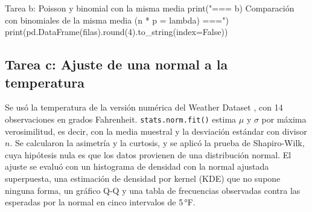 \documentclass[11pt,letterpaper]{article}
\begin{document}
\begin{codigo}[label=cod:b]{Tarea b: Poisson y binomial con la misma media}
print("\n=== b) Comparación con binomiales de la misma media (n * p = lambda) ===")
print(pd.DataFrame(filas).round(4).to_string(index=False))
\end{codigo}

\subsection{Tarea c: Ajuste de una normal a la temperatura}

Se usó la temperatura de la versión numérica del Weather Dataset \parencite{witten2017}, con 14 observaciones en grados Fahrenheit. \texttt{stats.norm.fit()} estima $\mu$ y $\sigma$ por máxima verosimilitud, es decir, con la media muestral y la desviación estándar con divisor $n$. Se calcularon la asimetría y la curtosis, y se aplicó la prueba de Shapiro-Wilk, cuya hipótesis nula es que los datos provienen de una distribución normal. El ajuste se evaluó con un histograma de densidad con la normal ajustada superpuesta, una estimación de densidad por kernel (KDE) que no supone ninguna forma, un gráfico Q-Q y una tabla de frecuencias observadas contra las esperadas por la normal en cinco intervalos de 5\,°F.
\end{document}
